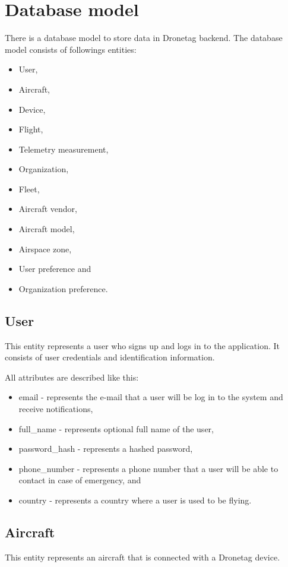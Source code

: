 \section{Database model}\label{sec:database-model}
There is a database model to store data in Dronetag backend.
The database model consists of followings entities:
\begin{itemize}
    \item User,
    \item Aircraft,
    \item Device,
    \item Flight,
    \item Telemetry measurement,
    \item Organization,
    \item Fleet,
    \item Aircraft vendor,
    \item Aircraft model,
    \item Airspace zone,
    \item User preference and
    \item Organization preference.
\end{itemize}

\subsection{User}\label{subsec:user}
This entity represents a user who signs up and logs in to the application.
It consists of user credentials and identification information.

All attributes are described like this:
\begin{itemize}
    \item email - represents the e-mail that a user will be log in to the system and receive notifications,
    \item full\_name - represents optional full name of the user,
    \item password\_hash - represents a hashed password,
    \item phone\_number - represents a phone number that a user will be able to contact in case of emergency, and
    \item country - represents a country where a user is used to be flying.
\end{itemize}

\subsection{Aircraft}\label{subsec:aircraft}
This entity represents an aircraft that is connected with a Dronetag device.

